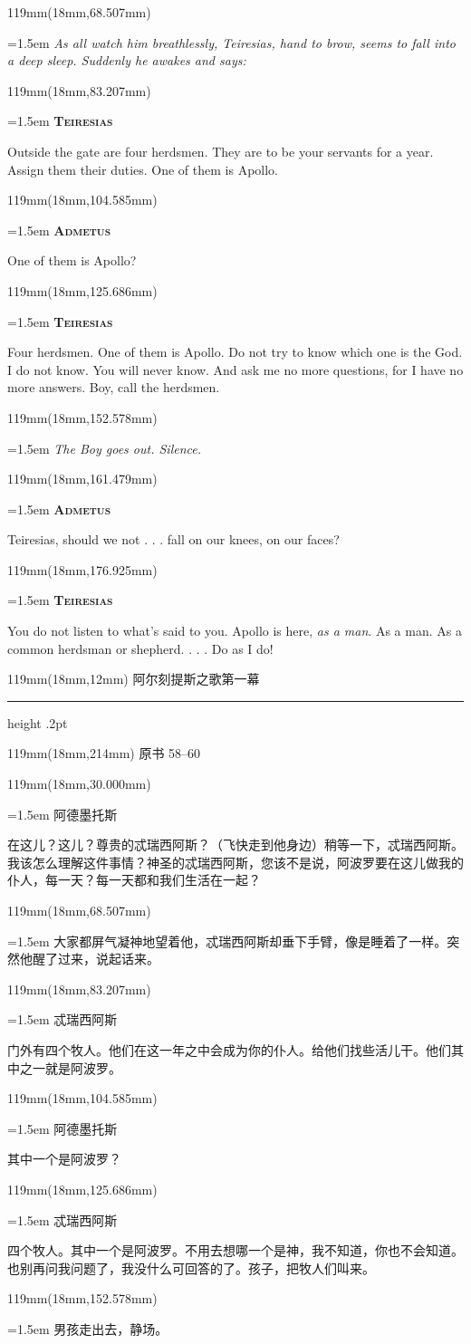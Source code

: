 \documentclass{article}
\newcommand{\ENsetup}{\normalfont\color{ink}\fontsize{11}{16.5}\selectfont\emergencystretch=1.5em}
\newcommand{\ZHsetup}{\normalfont\color{ink}\fontsize{10.5}{17}\selectfont\emergencystretch=1.5em}
\newcommand{\ENspeaker}[1]{{\fontsize{9.8}{13}\selectfont\scshape\bfseries #1}\par\vspace{3pt}}
\newcommand{\ZHspeaker}[1]{{\hei\fontsize{10.3}{13}\selectfont #1}\par\vspace{3pt}}
\newcommand{\ENstage}[1]{\par\noindent{\itshape #1}\par}
\newcommand{\Block}[3]{\begin{textblock*}{119mm}(18mm,#1mm){#2 #3\par}\end{textblock*}}
\newcommand{\Heading}[3]{%
  \begin{textblock*}{119mm}(18mm,12mm)
    \color{quiet}\fontsize{7.5}{10}\selectfont
    #1\hfill #2\par\vspace{3mm}\hrule height .2pt
  \end{textblock*}
  \begin{textblock*}{119mm}(18mm,214mm)
    \color{quiet}\fontsize{7}{10}\selectfont #3\hfill\thepage
  \end{textblock*}
}
\begin{document}
\Block{68.507}{\ENsetup}{\itshape 
As all watch him breathlessly, Teiresias, hand to brow, seems to fall into a deep sleep. Suddenly he awakes and says:\par}
\Block{83.207}{\ENsetup}{\ENspeaker{Teiresias}
Outside the gate are four herdsmen. They are to be your servants for a year. Assign them their duties. One of them is Apollo.\par}
\Block{104.585}{\ENsetup}{\ENspeaker{Admetus}
\ENstage{Repeating.}
One of them is Apollo?\par}
\Block{125.686}{\ENsetup}{\ENspeaker{Teiresias}
Four herdsmen. One of them is Apollo. Do not try to know which one is the God. I do not know. You will never know. And ask me no more questions, for I have no more answers. Boy, call the herdsmen.\par}
\Block{152.578}{\ENsetup}{\itshape 
The Boy goes out. Silence.\par}
\Block{161.479}{\ENsetup}{\ENspeaker{Admetus}
Teiresias, should we not . . . fall on our knees, on our faces?\par}
\Block{176.925}{\ENsetup}{\ENspeaker{Teiresias}
You do not listen to what's said to you. Apollo is here, \textit{as a man}. As a man. As a common herdsman or shepherd. . . . Do as I do!\par}
\newpage
\null
\Heading{阿尔刻提斯之歌}{第一幕}{原书 58–60}
\Block{30.000}{\ZHsetup}{\ZHspeaker{阿德墨托斯}在这儿？这儿？尊贵的忒瑞西阿斯？{\kai （飞快走到他身边）}稍等一下，忒瑞西阿斯。我该怎么理解这件事情？神圣的忒瑞西阿斯，您该不是说，阿波罗要在这儿做我的仆人，每一天？每一天都和我们生活在一起？\par }
\Block{68.507}{\ZHsetup}{\kai 大家都屏气凝神地望着他，忒瑞西阿斯却垂下手臂，像是睡着了一样。突然他醒了过来，说起话来。\par }
\Block{83.207}{\ZHsetup}{\ZHspeaker{忒瑞西阿斯}门外有四个牧人。他们在这一年之中会成为你的仆人。给他们找些活儿干。他们其中之一就是阿波罗。\par }
\Block{104.585}{\ZHsetup}{\ZHspeaker{阿德墨托斯}{\kai （重复道）}其中一个是阿波罗？\par }
\Block{125.686}{\ZHsetup}{\ZHspeaker{忒瑞西阿斯}四个牧人。其中一个是阿波罗。不用去想哪一个是神，我不知道，你也不会知道。也别再问我问题了，我没什么可回答的了。孩子，把牧人们叫来。\par }
\Block{152.578}{\ZHsetup}{\kai 男孩走出去，静场。\par }
\end{document}

